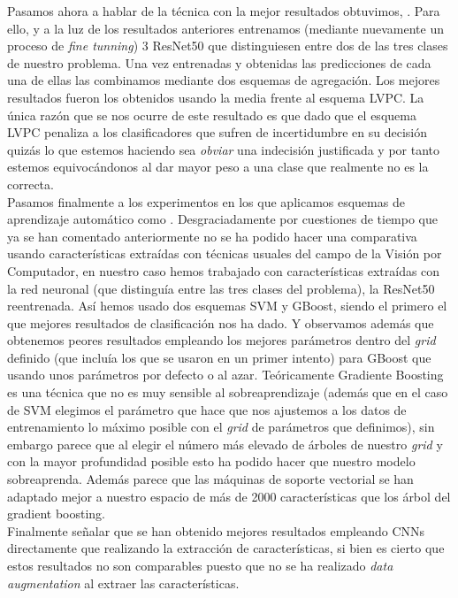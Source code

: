 Pasamos ahora a hablar de la técnica con la mejor resultados obtuvimos, . Para ello, y a la luz de los resultados anteriores entrenamos (mediante nuevamente un proceso de \textit{fine tunning}) 3 ResNet50 que distinguiesen entre dos de las tres clases de nuestro problema. Una vez entrenadas y obtenidas las predicciones de cada una de ellas las combinamos mediante dos esquemas de agregación. Los mejores resultados fueron los obtenidos usando la media frente al esquema LVPC. La única razón que se nos ocurre de este resultado es que dado que el esquema LVPC penaliza a los clasificadores que sufren de incertidumbre en su decisión quizás lo que estemos haciendo sea \textit{obviar} una indecisión justificada y por tanto estemos equivocándonos al dar mayor peso a una clase que realmente no es la correcta.\\

Pasamos finalmente a los experimentos en los que aplicamos esquemas de aprendizaje automático como . Desgraciadamente por cuestiones de tiempo que ya se han comentado anteriormente no se ha podido hacer una comparativa usando características extraídas con técnicas usuales del campo de la Visión por Computador, en nuestro caso hemos trabajado con características extraídas con la red neuronal (que distinguía entre las tres clases del problema), la ResNet50 reentrenada. Así hemos usado dos esquemas SVM y GBoost, siendo el primero el que mejores resultados de clasificación nos ha dado. Y observamos además que obtenemos peores resultados empleando los mejores parámetros dentro del \textit{grid} definido (que incluía los que se usaron en un primer intento) para GBoost que usando unos parámetros por defecto o al azar. Teóricamente Gradiente Boosting es una técnica que no es muy sensible al sobreaprendizaje (además que en el caso de SVM elegimos el parámetro que hace que nos ajustemos a los datos de entrenamiento lo máximo posible con el \textit{grid} de parámetros que definimos), sin embargo parece que al elegir el número más elevado de árboles de nuestro \textit{grid} y con la mayor profundidad posible esto ha podido hacer que nuestro modelo sobreaprenda. Además parece que las máquinas de soporte vectorial se han adaptado mejor a nuestro espacio de más de 2000 características que los árbol del gradient boosting.\\

Finalmente señalar que se han obtenido mejores resultados empleando CNNs directamente que realizando la extracción de características, si bien es cierto que estos resultados no son comparables puesto que no se ha realizado \textit{data augmentation} al extraer las características.





